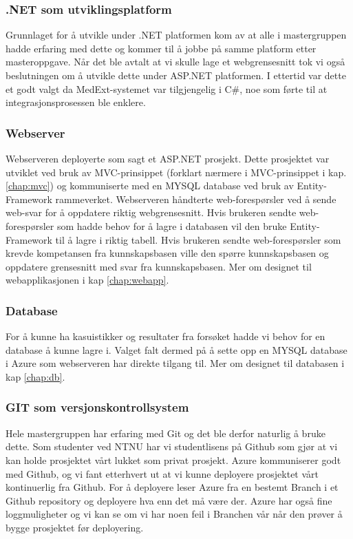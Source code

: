 \subsubsection{.NET som utviklingsplatform}
Grunnlaget for å utvikle under .NET platformen kom av at alle i mastergruppen hadde erfaring med dette og kommer til å jobbe på samme platform etter masteroppgave. Når det ble avtalt at vi skulle lage et webgrensesnitt tok vi også beslutningen om å utvikle dette under ASP.NET platformen. I ettertid var dette et godt valgt da MedExt-systemet var tilgjengelig i C\#, noe som førte til at integrasjonsprosessen ble enklere.
\subsubsection{Webserver}
Webserveren deployerte som sagt et ASP.NET prosjekt. Dette prosjektet var utviklet ved bruk av MVC-prinsippet (forklart nærmere i MVC-prinsippet i kap. \ref{chap:mvc}) og kommuniserte med en MYSQL database ved bruk av Entity-Framework rammeverket. Webserveren håndterte web-forespørsler ved å sende web-svar for å oppdatere riktig webgrensesnitt. Hvis brukeren sendte web-forespørsler som hadde behov for å  lagre i databasen vil den bruke Entity-Framework til å lagre i riktig tabell. Hvis brukeren sendte web-forespørsler som krevde kompetansen fra kunnskapsbasen ville den spørre kunnskapsbasen og oppdatere grensesnitt med svar fra kunnskapsbasen. Mer om designet til webapplikasjonen i kap \ref{chap:webapp}.
\subsubsection{Database}
For å kunne ha kasuistikker og resultater fra forsøket hadde vi behov for en database å kunne lagre i. Valget falt dermed på å sette opp en MYSQL database i Azure som webserveren har direkte tilgang til. Mer om designet til databasen i kap \ref{chap:db}.
\subsubsection{GIT som versjonskontrollsystem}
Hele mastergruppen har erfaring med Git og det ble derfor naturlig å bruke dette. Som studenter ved NTNU har vi studentlisens på Github som gjør at vi kan holde prosjektet vårt lukket som privat prosjekt. Azure kommuniserer godt med Github, og vi fant etterhvert ut at vi kunne deployere prosjektet vårt kontinuerlig fra Github. For å deployere leser Azure fra en bestemt Branch i et Github repository og deployere hva enn det må være der. Azure har også fine loggmuligheter og vi kan se om vi har noen feil i Branchen vår når den prøver å bygge prosjektet før deployering.

